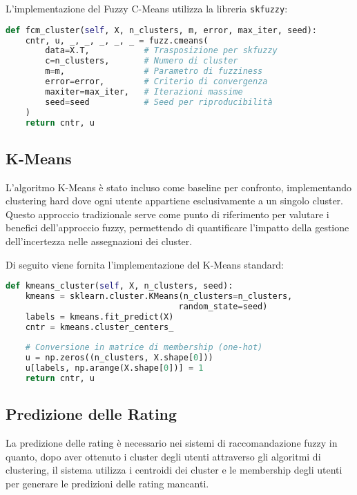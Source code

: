 L'implementazione del Fuzzy C-Means utilizza la libreria \texttt{skfuzzy}:

\begin{lstlisting}[language=Python, caption=Implementazione FCM]
def fcm_cluster(self, X, n_clusters, m, error, max_iter, seed):
    cntr, u, _, _, _, _, _ = fuzz.cmeans(
        data=X.T,           # Trasposizione per skfuzzy
        c=n_clusters,       # Numero di cluster
        m=m,                # Parametro di fuzziness
        error=error,        # Criterio di convergenza
        maxiter=max_iter,   # Iterazioni massime
        seed=seed           # Seed per riproducibilità
    )
    return cntr, u
\end{lstlisting}

\subsection{K-Means}
L'algoritmo K-Means è stato incluso come baseline per confronto, implementando clustering hard dove ogni utente appartiene esclusivamente a un singolo cluster. Questo approccio tradizionale serve come punto di riferimento per valutare i benefici dell'approccio fuzzy, permettendo di quantificare l'impatto della gestione dell'incertezza nelle assegnazioni dei cluster.

Di seguito viene fornita l'implementazione del K-Means standard:

\begin{lstlisting}[language=Python, caption=Implementazione K-Means]
def kmeans_cluster(self, X, n_clusters, seed):
    kmeans = sklearn.cluster.KMeans(n_clusters=n_clusters, 
                                   random_state=seed)
    labels = kmeans.fit_predict(X)
    cntr = kmeans.cluster_centers_
    
    # Conversione in matrice di membership (one-hot)
    u = np.zeros((n_clusters, X.shape[0]))
    u[labels, np.arange(X.shape[0])] = 1
    return cntr, u
\end{lstlisting}

\subsection{Predizione delle Rating}
La predizione delle rating è necessario nei sistemi di  raccomandazione fuzzy in quanto, dopo aver ottenuto i cluster degli utenti attraverso gli algoritmi di clustering, il sistema utilizza i centroidi dei cluster e le membership degli utenti per generare le predizioni delle rating mancanti.

